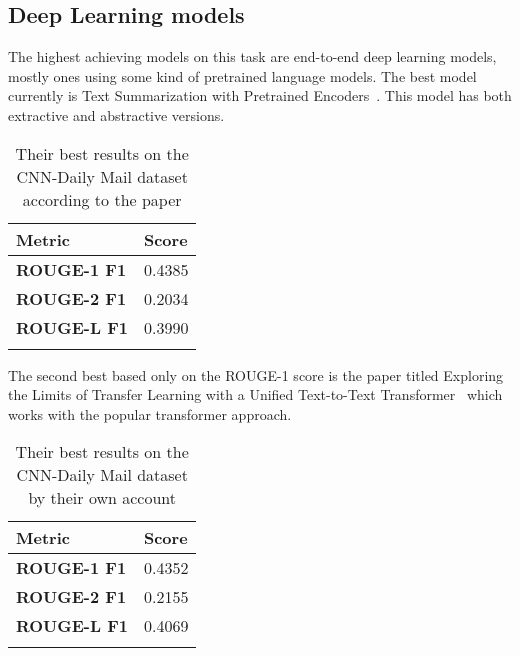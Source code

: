 \subsection{Deep Learning models}

The highest achieving models on this task are end-to-end deep learning models, mostly ones using some kind of pretrained language models.
The best model currently is Text Summarization with Pretrained Encoders~\cite{BERTsum}. This model has both extractive and abstractive versions.

\begin{table}
	\begin{tabular}{| l | l |}
	\hline 
	\textbf{Metric}&\textbf{Score} \\ \hline \hline
	\textbf{ROUGE-1 F1}&0.4385 \\ \hline
	\textbf{ROUGE-2 F1}&0.2034 \\ \hline
	\textbf{ROUGE-L F1}&0.3990 \\ \hline
	\caption{Their best results on the CNN-Daily Mail dataset according to the paper}
	\end{tabular}
\end{table}

The second best based only on the ROUGE-1 score is the paper titled Exploring the Limits of Transfer Learning with a Unified Text-to-Text Transformer~\cite{TransferSum} which works with the popular transformer approach.

\begin{table}
	\begin{tabular}{| l | l |}
		\hline 
		\textbf{Metric}&\textbf{Score} \\ \hline \hline
		\textbf{ROUGE-1 F1}&0.4352 \\ \hline
		\textbf{ROUGE-2 F1}&0.2155 \\ \hline
		\textbf{ROUGE-L F1}&0.4069 \\ \hline
		\caption{Their best results on the CNN-Daily Mail dataset by their own account}
	\end{tabular}
\end{table}